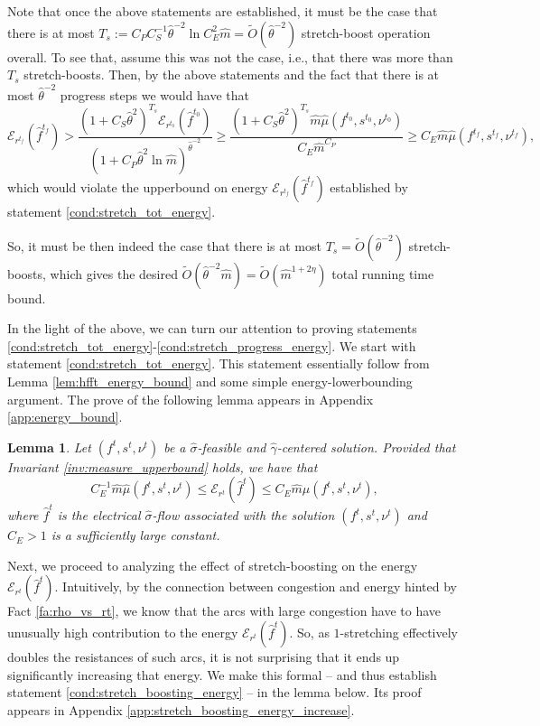 \documentclass[11pt, letterpaper]{article}
\newtheorem{lemma}[theorem]{Lemma}
\newcommand{\cendecrease}{C_{P}}
\newcommand{\cenergy}{C_{E}}
\newcommand{\cincrease}{C_{S}}
\newcommand{\tO}[1]{\widetilde{O}(#1)}
\newcommand{\hm}{\widehat{m}}
\newcommand{\energy}[2]{\mathcal{E}_{#1}(#2)}
\newcommand{\hmu}{\hat{\mu}}
\newcommand{\hgamma}{\hat{\gamma}}
\newcommand{\htheta}{\hat{\theta}}
\newcommand{\vnu}{\boldsymbol{\mathit{\nu}}}
\newcommand{\hvsigma}{\boldsymbol{\mathit{\hat{\sigma}}}}
\newcommand{\ff}{\boldsymbol{\mathit{f}}}
\newcommand{\hff}{\boldsymbol{\mathit{\hat{f}}}}
\newcommand{\rr}{\boldsymbol{\mathit{r}}}
\renewcommand{\ss}{\boldsymbol{\mathit{s}}}
\begin{document}
Note that once the above statements are established, it must be the case that there is at most $T_s:=\cendecrease \cincrease^{-1} \htheta^{-2} \ln \cenergy^2 \hm=\tO{\htheta^{-2}}$ stretch-boost operation overall. To see that, assume this was not the case, i.e., that there was more than $T_s$ stretch-boosts. Then, by the above statements and the fact that there is at most $\htheta^{-2}$ progress steps we would have that
\[
\energy{\rr^{t_f}}{\hff^{t_f}} > \frac{(1+\cincrease\htheta^2)^{T_s} \energy{\rr^{t_0}}{\hff^{t_0}}}{(1+\cendecrease\htheta^2\ln \hm)^{\htheta^{-2}}}\geq \frac{(1+\cincrease\htheta^2)^{T_s} \hm \hmu(\ff^{t_0},\ss^{t_0},\vnu^{t_0})}{\cenergy\hm^{\cendecrease}}\geq \cenergy \hm \hmu(\ff^{t_f},\ss^{t_f},\vnu^{t_f}),
\]
which would violate the upperbound on energy $\energy{\rr^{t_f}}{\hff^{t_f}}$ established by statement \eqref{cond:stretch_tot_energy}.

 So, it must be then indeed the case that there is at most $T_s=\tO{\htheta^{-2}}$ stretch-boosts, which gives the desired $\tO{\htheta^{-2}\hm}=\tO{\hm^{1+2\eta}}$ total running time bound. 

In the light of the above, we can turn our attention to proving statements \eqref{cond:stretch_tot_energy}-\eqref{cond:stretch_progress_energy}. We start with statement \eqref{cond:stretch_tot_energy}. This statement essentially follow from Lemma \ref{lem:hfft_energy_bound} and some simple energy-lowerbounding argument. The prove of the following lemma appears in Appendix \ref{app:energy_bound}. 


\begin{lemma}
\label{lem:energy_bound}
Let $(\ff^t,\ss^t,\vnu^t)$ be a $\hvsigma$-feasible and $\hgamma$-centered solution. Provided that Invariant \ref{inv:measure_upperbound} holds, we have that
\[
\cenergy^{-1}\hm \hmu(\ff^t,\ss^t,\vnu^t)\leq \energy{\rr^t}{\hff^t}\leq \cenergy \hm \hmu(\ff^t,\ss^t,\vnu^t),
\]
where $\hff^t$ is the electrical $\hvsigma$-flow associated with the solution $(\ff^t,\ss^t,\vnu^t)$ and $\cenergy>1$ is a sufficiently large constant. 
\end{lemma}


Next, we proceed to analyzing the effect of stretch-boosting on the energy $\energy{\rr^t}{\hff^t}$. Intuitively, by the connection between congestion and energy hinted  by Fact \ref{fa:rho_vs_rt}, we know that the arcs with large congestion have to have unusually high contribution to the energy $\energy{\rr^t}{\hff^t}$. So, as $1$-stretching effectively doubles the resistances of such arcs, it is not surprising that it ends up significantly increasing that energy. We make this formal -- and thus establish statement \eqref{cond:stretch_boosting_energy} -- in the lemma below. Its proof appears in Appendix \ref{app:stretch_boosting_energy_increase}.
\end{document}
